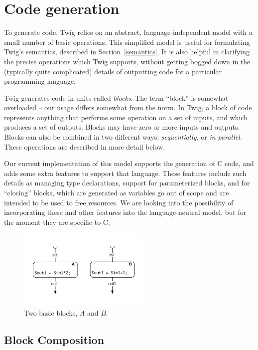 
\section{Code generation}
\label{sec:code-gen}

To generate code, Twig relies on an abstract, language-independent model with a small number of basic operations. This simplified model is useful for formulating Twig's semantics, described in Section~\ref{semantics}. It is also helpful in clarifying the precise operations which Twig supports, without getting bogged down in the (typically quite complicated) details of outputting code for a particular programming language.

Twig generates code in units called \emph{blocks}. The term ``block'' is somewhat overloaded -- our usage differs somewhat from the norm. In Twig, a block of code represents anything that performs some operation on a set of inputs, and which produces a set of outputs. Blocks may have zero or more inputs and outputs. Blocks can also be combined in two different ways: \emph{sequentially}, or \emph{in parallel}. These operations are described in more detail below.

Our current implementation of this model supports the generation of C code, and adds some extra features to support that language. These features include such details as managing type declarations, support for parameterized blocks, and for ``closing'' blocks, which are generated as variables go out of scope and are intended to be used to free resources. We are looking into the possibility of incorporating these and other features into the language-neutral model, but for the moment they are specific to C.

\begin{figure}[ht]
\centering
\includegraphics[width=2.5in]{images/code-gen-basic}
\caption{Two basic blocks, $A$ and $B$.}
\label{fig:codegen-blocks}
\end{figure}

\subsection{Block Composition}

